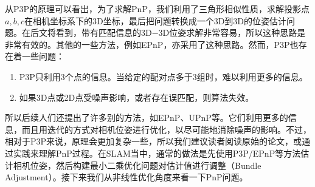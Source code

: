 从P3P的原理可以看出，为了求解PnP，我们利用了三角形相似性质，求解投影点$a,b,c$在相机坐标系下的3D坐标，最后把问题转换成一个3D到3D的位姿估计问题。在后文将看到，带有匹配信息的3D−3D位姿求解非常容易，所以这种思路是非常有效的。其他的一些方法，例如EPnP，亦采用了这种思路。然而，P3P也存在着一些问题：

\begin{enumerate}
	\item P3P只利用3个点的信息。当给定的配对点多于3组时，难以利用更多的信息。
	\item 如果3D点或2D点受噪声影响，或者存在误匹配，则算法失效。
\end{enumerate}

所以后续人们还提出了许多别的方法，如EPnP、UPnP等。它们利用更多的信息，而且用迭代的方式对相机位姿进行优化，以尽可能地消除噪声的影响。不过，相对于P3P来说，原理会更加复杂一些，所以我们建议读者阅读原始的论文，或通过实践来理解PnP过程。在SLAM当中，通常的做法是先使用P3P/EPnP等方法估计相机位姿，然后构建最小二乘优化问题对估计值进行调整（Bundle Adjustment）。接下来我们从非线性优化角度来看一下PnP问题。

%
%
%
%
%
%
%


